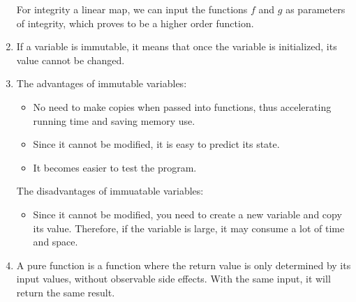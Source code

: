 \documentclass[12pt, a4paper]{article}
\begin{document}
\begin{enumerate}
          For integrity a linear map, we can input the functions $f$ and $g$ as parameters of integrity, which proves to be a higher order function.
    
    \item If a variable is immutable, it means that once the variable is initialized, its value cannot be changed.
    
    \item The advantages of immutable variables:
          \begin{itemize}
              \item No need to make copies when passed into functions, thus accelerating running time and saving memory use.
              \item Since it cannot be modified, it is easy to predict its state.
              \item It becomes easier to test the program.
          \end{itemize}

          The disadvantages of immuatable variables:
          \begin{itemize}
              \item Since it cannot be modified, you need to create a new variable and copy its value. 
                    Therefore, if the variable is large, it may consume a lot of time and space.
          \end{itemize}
    
          \item A pure function is a function where the return value is only determined by its input values, without observable side effects. 
                With the same input, it will return the same result.

\end{enumerate}
\end{document}
